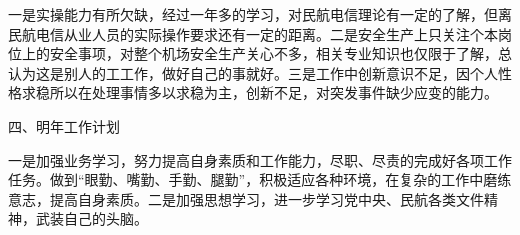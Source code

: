 \documentclass[a4paper,utf8,12pt]{ctexart}%
\begin{document}
一是实操能力有所欠缺，经过一年多的学习，对民航电信理论有一定的了解，但离民航电信从业人员的实际操作要求还有一定的距离。二是安全生产上只关注个本岗位上的安全事项，对整个机场安全生产关心不多，相关专业知识也仅限于了解，总认为这是别人的工工作，做好自己的事就好。三是工作中创新意识不足，因个人性格求稳所以在处理事情多以求稳为主，创新不足，对突发事件缺少应变的能力。

{\heiti 四、明年工作计划}

一是加强业务学习，努力提高自身素质和工作能力，尽职、尽责的完成好各项工作任务。做到“眼勤、嘴勤、手勤、腿勤”，积极适应各种环境，在复杂的工作中磨练意志，提高自身素质。二是加强思想学习，进一步学习党中央、民航各类文件精神，武装自己的头脑。\par

~\\[50pt] %
\end{document}

